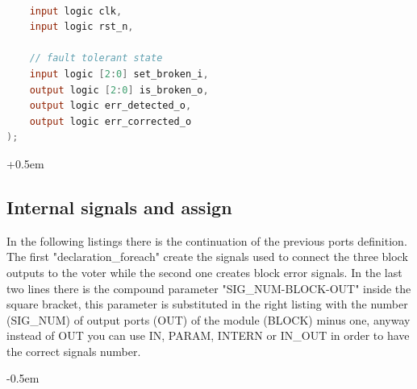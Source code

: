 {{{\begin{parcolumns}[colwidths={1=0.54\textwidth}, distance=0.5em]{2}
{\begin{lstlisting}[basicstyle=\ttfamily\scriptsize, language=Verilog, caption=Declaration Travulog Code, label=lst:declTV]
	
	input logic clk,
	input logic rst_n,  
	
	// fault tolerant state
	input logic [2:0] set_broken_i,
	output logic [2:0] is_broken_o,
	output logic err_detected_o,
	output logic err_corrected_o
);
    				\end{lstlisting}
    			}
    		\end{parcolumns}
    	
    		\openup +0.5em
    		
    		
    	}%
    	
    	\subsection{Internal signals and assign}{
    		In the following listings there is the continuation of the previous ports definition. The first "declaration\_foreach" create the signals used to connect the three block outputs to the voter while the second one creates block error signals. In the last two lines there is the compound parameter "SIG\_NUM-BLOCK-OUT" inside the square bracket,  this parameter is substituted in the right listing with the number (SIG\_NUM) of output ports (OUT) of the module (BLOCK) minus one, anyway instead of OUT you can use IN, PARAM, INTERN or IN\_OUT in order to have the correct signals number.
    		
    		\openup -0.5em
    		
    		\begin{parcolumns}[colwidths={1=0.5\textwidth}, distance=0.5em]{2}
\end{parcolumns}}}}
